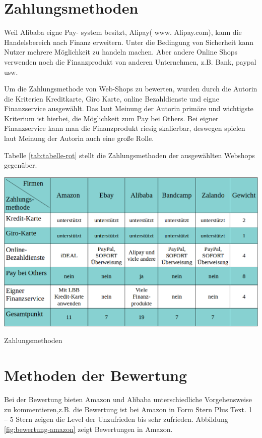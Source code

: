 \section{Zahlungsmethoden}

Weil Alibaba eigne Pay- system besitzt, Alipay( www. Alipay.com), kann die Handelsbereich nach Finanz erweitern. Unter die Bedingung von Sicherheit kann Nutzer mehrere Möglichkeit zu handeln  machen. Aber andere Online Shops verwenden noch die Finanzprodukt von anderen Unternehmen, z.B. Bank, paypal usw.

Um die Zahlungsmethode von Web-Shops zu bewerten, wurden durch die Autorin die Kriterien Kreditkarte, Giro Karte, online Bezahldienste und eigne Finanzservice ausgewählt. Das laut Meinung der Autorin primäre und wichtigste Kriterium ist hierbei, die Möglichkeit zum Pay bei Others. Bei eigner Finanzservice kann man die Finanzprodukt riesig skalierbar, deswegen spielen laut Meinung der Autorin auch eine große Rolle.

Tabelle \vref{tab:tabelle-rot} stellt die Zahlungsmethoden der ausgewählten Webshops gegenüber.

\begin{table}[htbp]
	\centering
	\includegraphics[width=1\textwidth]{bilder/tabelle-blau.png}
	\caption{Zahlungsmethoden}
	\label{tab:tabelle-blau}
\end{table}


\section{Methoden der Bewertung}

Bei der Bewertung bieten Amazon und Alibaba unterschiedliche Vorgehensweise zu kommentieren,z.B. die Bewertung ist bei Amazon in Form Stern Plus Text. 1 – 5 Stern zeigen die Level der Unzufrieden bis sehr zufrieden. Abbildung \vref{fig:bewertung-amazon} zeigt Bewertungen in Amazon.

